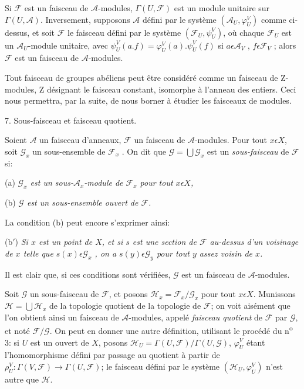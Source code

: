 Si $\mathcal{F}$ est un faisceau de $\mathcal{A}$-modules, $\Gamma(U, \mathcal{F})$ est un module unitaire sur $\Gamma(U, \mathcal{A})$. Inversement, supposons $\mathcal{A}$ défini par le système $(\mathcal{A}_U , \varphi_U^V)$ comme ci-dessus, et soit $\mathcal{F}$ le faisceau défini par le système $(\mathcal{F}_U , \psi_U^V)$, où chaque $\mathcal{F}_U$ est un $\mathcal{A}_U$-module unitaire, avec $\psi_U^V(a.f) = \varphi_U^V(a).\psi_U^V(f)$ si $a \epsilon \mathcal{A}_V$ , $f \epsilon \mathcal{F}_V$ ; alors $\mathcal{F}$ est un faisceau de $\mathcal{A}$-modules.

Tout faisceau de groupes abéliens peut être considéré comme un faisceau de $\mathrm{Z}$-modules, $\mathrm{Z}$ désignant le faisceau constant, isomorphe à l'anneau des entiers. Ceci nous permettra, par la suite, de nous borner à étudier les faisceaux de modules.


7. Sous-faisceau et faisceau quotient.

Soient $\mathcal{A}$ un faisceau d'anneaux, $\mathcal{F}$ un faisceau de $\mathcal{A}$-modules. Pour tout $x \epsilon X$, soit $\mathcal{G}_x$ un sous-ensemble de $\mathcal{F}_x$ . On dit que $\mathcal{G} = \bigcup \mathcal{G}_x$ est un \emph{sous-faisceau} de $\mathcal{F}$ si:

(a) \emph{$\mathcal{G}_x$ est un sous-$\mathcal{A}_x$-module de $\mathcal{F}_x$ pour tout $x \epsilon X$,}

(b) \emph{$\mathcal{G}$ est un sous-ensemble ouvert de $\mathcal{F}$.}

La condition (b) peut encore s'exprimer ainsi:

(b$'$) \emph{Si $x$ est un point de $X$, et si $s$ est une section de $\mathcal{F}$ au-dessus d'un voisinage de $x$ telle que $s(x) \epsilon \mathcal{G}_x$ , on a $s(y) \epsilon \mathcal{G}_y$ pour tout $y$ assez voisin de $x$.}

Il est clair que, si ces conditions sont vérifiées, $\mathcal{G}$ est un faisceau de $\mathcal{A}$-modules.

Soit $\mathcal{G}$ un sous-faisceau de $\mathcal{F}$, et posons $\mathcal{H}_x = \mathcal{F}_x/\mathcal{G}_x$ pour tout $x \epsilon X$. Munissons $\mathcal{H} = \bigcup \mathcal{H}_x$ de la topologie quotient de la topologie de $\mathcal{F}$; on voit aisément que l'on obtient ainsi un faisceau de $\mathcal{A}$-modules, appelé \emph{faisceau quotient} de $\mathcal{F}$ par $\mathcal{G}$, et noté $\mathcal{F}/\mathcal{G}$. On peut en donner une autre définition, utilisant le procédé du n\textsuperscript{o} 3:
si $U$ est un ouvert de $X$, posons $\mathcal{H}_U = \Gamma(U, \mathcal{F})/\Gamma(U, \mathcal{G})$, $\varphi_U^V$ étant l'homomorphisme défini par passage au quotient à partir de $\rho_U^V : \Gamma(V, \mathcal{F}) \to \Gamma(U, \mathcal{F})$; le faisceau défini par le système $(\mathcal{H}_U , \varphi_U^V)$ n'est autre que $\mathcal{H}$.

